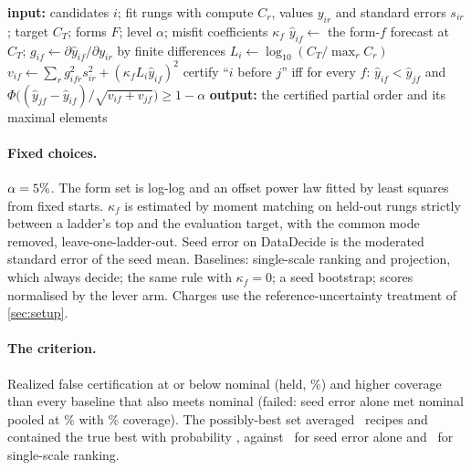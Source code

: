 \begin{algorithm}[h]
\caption{CERTIFY, as pre-registered.}
\label{alg:certify}
\begin{algorithmic}
\STATE \textbf{input:} candidates $i$; fit rungs with compute $C_r$, values $y_{ir}$ and standard errors $s_{ir}$; target $C_T$; forms $F$; level $\alpha$; misfit coefficients $\kappa_f$
\STATE $\hat y_{if}\gets$ the form-$f$ forecast at $C_T$; $g_{if}\gets\partial\hat y_{if}/\partial y_{ir}$ by finite differences
\STATE $L_i\gets\log_{10}(C_T/\max_r C_r)$  %
\STATE $v_{if}\gets\sum_r g_{ifr}^2 s_{ir}^2+(\kappa_f L_i\hat y_{if})^2$  %
\ENDFOR
{}
\STATE certify ``$i$ before $j$'' iff for every $f$: $\hat y_{if}<\hat y_{jf}$ and $\Phi\bigl((\hat y_{jf}-\hat y_{if})/\sqrt{v_{if}+v_{jf}}\bigr)\ge 1-\alpha$  %
\ENDFOR
\STATE \textbf{output:} the certified partial order and its maximal elements
\end{algorithmic}
\end{algorithm}

\paragraph{Fixed choices.} $\alpha=5\%$. The form set is log-log and an
offset power law fitted by least squares from fixed starts. $\kappa_f$ is
estimated by moment matching on held-out rungs strictly between a ladder's top
and the evaluation target, with the common mode removed, leave-one-ladder-out.
Seed error on DataDecide is the moderated standard error of the seed mean.
Baselines: single-scale ranking and projection, which always decide; the same
rule with $\kappa_f=0$; a seed bootstrap;  %
scores normalised by the lever arm. Charges use the reference-uncertainty
treatment of \cref{sec:setup}.



\paragraph{The criterion.} Realized false certification at or below nominal
(held, \stageSelFcr\%) and higher coverage than every baseline that also meets
nominal (failed: seed error alone met nominal pooled at \stageSeedFcr\% with
\stageSeedCov\% coverage). The possibly-best set averaged \stageSelSetSize\
recipes and contained the true best with probability \stageSelBest, against
\stageSeedBest\ for seed error alone and \stageSingleBest\ for single-scale
ranking.

